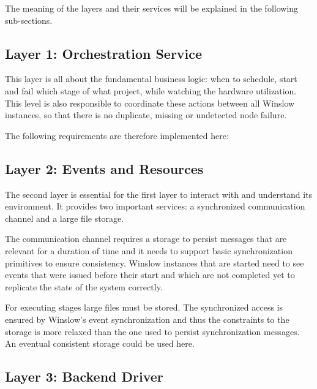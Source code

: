 The meaning of the layers and their services will be explained in the following sub-sections.

\subsection{Layer 1: Orchestration Service}
\label{analysis:layer_1}

This layer is all about the fundamental business logic: when to schedule, start and fail which stage of what project, while watching the hardware utilization.
This level is also responsible to coordinate these actions between all Winslow instances, so that there is no duplicate, missing or undetected node failure.

The following requirements are therefore implemented here: 

\subsection{Layer 2: Events and Resources}
\label{analysis:layer_2}

The second layer is essential for the first layer to interact with and understand its environment.
It provides two important services: a synchronized communication channel and a large file storage.

The communication channel requires a storage to persist messages that are relevant for a duration of time and it needs to  support basic synchronization primitives to ensure consistency.
Winslow instances that are started need to see events that were issued before their start and which are not completed yet to replicate the state of the system correctly.

For executing stages large files must be stored.
The synchronized access is ensured by Winslow's event synchronization and thus the constraints to the storage is more relaxed than the one used to persist synchronization messages.
An eventual consistent storage could be used here. 


\subsection{Layer 3: Backend Driver}
\label{analysis:layer_3}

